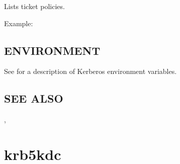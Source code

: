 \documentclass[letterpaper,10pt,english]{sphinxmanual}
\begin{document}
\sphinxAtStartPar
Lists ticket policies.

\sphinxAtStartPar
Example:

\begin{sphinxVerbatim}[commandchars=\\\{\}]
    
      
  
\end{sphinxVerbatim}


\subsection{ENVIRONMENT}
\label{\detokenize{admin/admin_commands/kdb5_ldap_util:environment}}\label{\detokenize{admin/admin_commands/kdb5_ldap_util:kdb5-ldap-util-list-policy-end}}
\sphinxAtStartPar
See  for a description of Kerberos environment
variables.


\subsection{SEE ALSO}
\label{\detokenize{admin/admin_commands/kdb5_ldap_util:see-also}}
\sphinxAtStartPar
{\hyperref[\detokenize{admin/admin_commands/kadmin_local:kadmin-1}]{}}, 


\section{krb5kdc}
\label{\detokenize{admin/admin_commands/krb5kdc:krb5kdc}}\label{\detokenize{admin/admin_commands/krb5kdc:krb5kdc-8}}\label{\detokenize{admin/admin_commands/krb5kdc::doc}}
\end{document}
